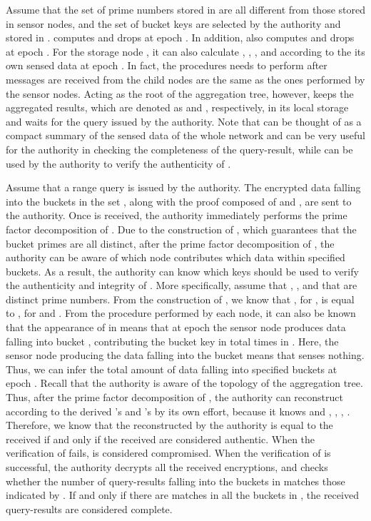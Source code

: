 \documentclass[conference]{IEEEtran}
\begin{document}
Assume that the set  of  prime numbers stored in  are all different from those stored in sensor nodes, and the set  of  bucket keys are selected by the authority and stored in .  computes  and drops  at epoch . In addition,  also computes  and drops  at epoch . For the storage node , it can also calculate , , , and  according to the its own sensed data at epoch . In fact, the procedures  needs to perform after messages are received from the child nodes are the same as the ones performed by the sensor nodes. Acting as the root of the aggregation tree, however,  keeps the aggregated results, which are denoted as  and , respectively, in its local storage and waits for the query issued by the authority. Note that  can be thought of as a compact summary of the sensed data of the whole network and can be very useful for the authority in checking the completeness of the query-result, while  can be used by the authority to verify the authenticity of .

Assume that a range query  is issued by the authority. The encrypted data falling into the buckets in the set , along with the proof composed of  and , are sent to the authority. Once  is received, the authority immediately performs the prime factor decomposition of . Due to the construction of , which guarantees that the bucket primes are all distinct, after the prime factor decomposition of , the authority can be aware of which node contributes which data within specified buckets. As a result, the authority can know which keys should be used to verify the authenticity and integrity of . More specifically, assume that , , and that  are distinct prime numbers. From the construction of , we know that , for , is equal to , for  and . From the procedure performed by each node, it can also be known that the appearance of  in  means that at epoch  the sensor node  produces  data falling into bucket , contributing the bucket key  in total  times in . Here, the sensor node  producing the data falling into the bucket  means that  senses nothing. Thus, we can infer the total amount of data falling into specified buckets at epoch . Recall that the authority is aware of the topology of the aggregation tree. Thus, after the prime factor decomposition of , the authority can reconstruct  according to the derived 's and 's by its own effort, because it knows  and , , , . Therefore, we know that the  reconstructed by the authority is equal to the received  if and only if the received  are considered authentic. When the verification of  fails,  is considered compromised. When the verification of  is successful, the authority decrypts all the received encryptions, and checks whether the number of query-results falling into the buckets in  matches those indicated by . If and only if there are matches in all the buckets in , the received query-results are considered complete.
\end{document}
